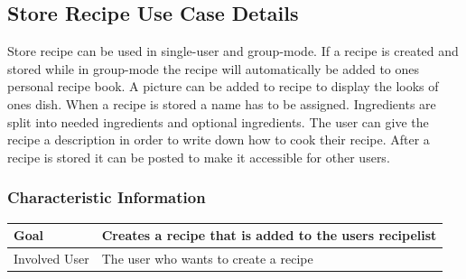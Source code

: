\documentclass[12pt]{article}
\theoremstyle{definition}
\begin{document}
\subsection{Store Recipe Use Case Details}

Store recipe can be used in single-user and group-mode. If a recipe is created and stored while in group-mode the recipe will automatically be added to ones personal recipe book. A picture can be added to recipe to display the looks of ones dish. When a recipe is stored a name has to be assigned. Ingredients are split into needed ingredients and optional ingredients. The user can give the recipe a description in order to write down how to cook their recipe. After a recipe is stored it can be posted to make it accessible for other users.

\subsubsection{Characteristic Information}

\begin{tabular}{|l|l|}
\hline
Goal & Creates a recipe that is added to the users recipelist  \\ \hline
Involved User & The user who wants to create a recipe \\ \hline
\end{tabular}
\end{document}
